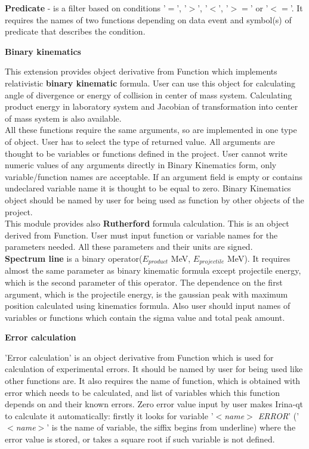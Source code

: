 \documentclass[a4paper]{article}
\begin{document}
{
\textbf{Predicate} - is a filter based on conditions '$=$', '$>$', '$<$', '$>=$' or '$<=$'. 
It requires the names of two functions depending on data event and symbol(s) of predicate that describes the condition.
}
\hypertarget{fbkin}{
\begin{center}\textbf{Binary kinematics}\end{center}
}
{
This extension provides object derivative from Function which implements relativistic \textbf{ binary kinematic} formula.
User can use this object for calculating angle of divergence or energy of collision in center of mass system.
Calculating product energy in laboratory system and Jacobian of transformation into center of mass system is also available.
\\ 
All these functions require the same arguments, so are implemented in one type of object.
User has to select the type of returned value.
All arguments are thought to be variables or functions defined in the project.
User cannot write numeric values of any arguments directly in Binary Kinematics form, only variable/function names are acceptable.
If an argument field is empty or contains undeclared variable name it is thought to be equal to zero.
Binary Kinematics object should be named by user for being used as function by other objects of the project.
\\
This module provides also \textbf{Rutherford} formula calculation. 
This is an object derived from Function.
User must input function or variable names for the parameters needed.
All these parameters and their units are signed.
\\
\textbf{Spectrum line} is a binary operator($E_{product}$ MeV, $E_{projectile}$ MeV).
It requires almost the same parameter as binary kinematic formula except projectile energy, which is the second parameter of this operator.
The dependence on the first argument, which is the projectile energy, is the gaussian peak with maximum position calculated using kinematics formula.
Also user should input names of variables or functions which contain the sigma value and total peak amount.
}
%
\hypertarget{errorcalc}{\\}
\begin{center}\textbf{Error calculation}\end{center}
{
{'Error calculation'} is an object derivative from Function which is used for calculation of experimental errors. 
It should be named by user for being used like other functions are. 
It also requires the name of function, which is obtained with error which needs to be calculated, and list of variables which this function depends on and their known errors. 
Zero error value input by user makes Irina-qt to calculate it automatically: firstly it looks for variable {'\textit{$<$name$>$ ERROR}'} ('\textit{$<$name$>$}' is the name of variable, the siffix begins from underline) where the error value is stored, or takes a square root if such variable is not defined.
}
\end{document}

